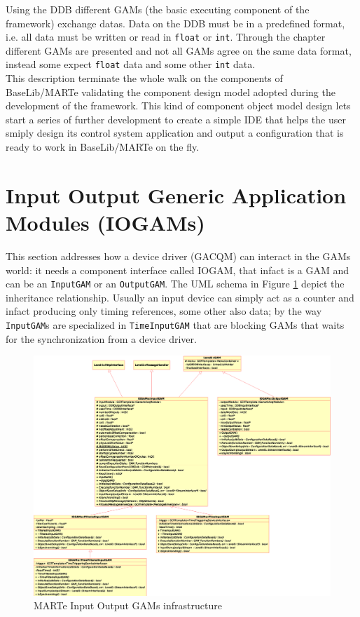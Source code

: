 Using the DDB different GAMs (the basic executing component of the framework) exchange datas. Data on the DDB must be in a predefined format, i.e. all data must be written or read in \texttt{float} or \texttt{int}. Through the chapter different GAMs are presented and not all GAMs agree on the same data format, instead some expect \texttt{float} data and some other \texttt{int} data.\\


This description terminate the whole walk on the components of BaseLib/MARTe validating the component design model adopted during the development of the framework. This kind of component object model design lets start a series of further development to create a simple IDE that helps the user smiply design its control system application and output a configuration that is ready to work in BaseLib/MARTe on the fly.



\section{Input Output Generic Application Modules (IOGAMs)}
This section addresses how a device driver (GACQM) can interact in the GAMs world: it needs a component interface called IOGAM, that infact is a GAM and can be an \texttt{InputGAM} or an \texttt{OutputGAM}. The UML schema in Figure \ref{f:MARTe:IOGAMs} depict the inheritance relationship. Usually an input device can simply act as a counter and infact producing only timing references, some other also data; by the way \texttt{InputGAM}s are specialized in \texttt{TimeInputGAM} that are blocking GAMs that waits for the synchronization from a device driver. \\

\begin{figure}[h!]
 \begin{center}
  \includegraphics[width=\textwidth]{MARTe/IOGAMs.eps}
  \caption{MARTe Input Output GAMs infrastructure}
  \label{f:MARTe:IOGAMs}
 \end{center}
\end{figure}

